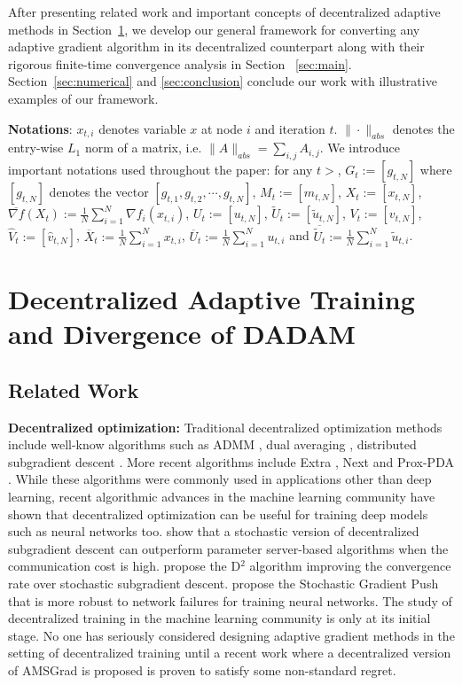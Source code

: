 \documentclass{article} %
\begin{document}
After presenting related work and important concepts of decentralized adaptive methods in Section~\ref{sec:prelim}, we develop our general framework for converting any adaptive gradient algorithm in its decentralized counterpart along with their rigorous finite-time convergence analysis in Section ~\ref{sec:main}. Section~\ref{sec:numerical} and \ref{sec:conclusion} conclude our work with illustrative examples of our framework.

 \textbf{Notations}: $x_{t,i}$ denotes variable $x$ at node $i$ and iteration $t$. $\|\cdot \|_{abs}$ denotes the entry-wise $L_1$ norm of a matrix, i.e. $\|A\|_{abs}= \sum_{i,j} A_{i,j}$. 
We introduce important notations used throughout the paper: for any $t>$, $G_t := [g_{t,N}]$ where $[g_{t,N}]$ denotes the vector $[g_{t,1}, g_{t,2}, \cdots, g_{t,N}]$, $M_t := [m_{t,N}]$, $X_t := [x_{t,N}]$, $\overline {\nabla f}(X_t) := \frac{1}{N}\sum_{i=1}^N \nabla f_i(x_{t,i})$, $U_t := [u_{t,N}]$, $ \tilde U_t := [\tilde u_{t,N}]$, $ V_t := [ v_{t,N}]$, $\hat V_t := [\hat v_{t,N}]$, $\overline X_t := \frac{1}{N}\sum_{i=1}^N x_{t,i} $, $\overline U_t := \frac{1}{N}\sum_{i=1}^N u_{t,i} $ and $\overline {\tilde U_t} := \frac{1}{N}\sum_{i=1}^N  \tilde u_{t,i} $. 


 
\vspace{-0.05in}
\section{Decentralized Adaptive Training and Divergence of DADAM}\label{sec:prelim}
\vspace{-0.05in}

\subsection{Related Work}
\textbf{Decentralized optimization:} 
Traditional decentralized optimization methods include well-know algorithms such as ADMM \citep{boyd2011distributed}, dual averaging \citep{duchi2011dual}, distributed subgradient descent \citep{nedic2009distributed}. 
More recent algorithms include Extra \citep{shi2015extra}, Next \citep{di2016next} and Prox-PDA \citep{hong2017prox}.  
While these algorithms were commonly used in applications other than deep learning, recent algorithmic advances in the machine learning community have shown that decentralized optimization can be useful for training deep models such as neural networks too. 
\citet{lian2017can} show that a stochastic version of decentralized subgradient descent can outperform parameter server-based algorithms when the communication cost is high. 
\citet{tang2018d} propose the D$^2$ algorithm improving the convergence rate over stochastic subgradient descent.
\citet{assran2018stochastic} propose the Stochastic Gradient Push that is more robust to network failures for training neural networks. 
The study of decentralized training in the machine learning community is only at its initial stage. 
No one has seriously considered designing adaptive gradient methods in the setting of decentralized training until a recent work \citep{nazari2019dadam} where a decentralized version of AMSGrad \citep{reddi2019convergence} is proposed is proven to satisfy some non-standard regret. 
\end{document}
